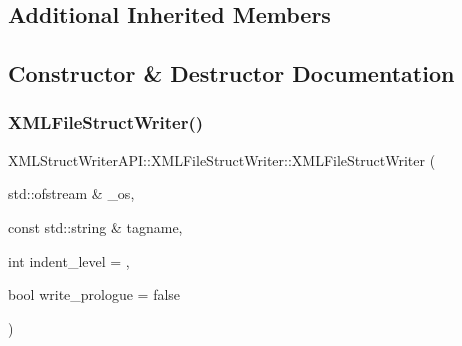 \subsection*{Additional Inherited Members}


\subsection{Constructor \& Destructor Documentation}
\mbox{\label{classXMLStructWriterAPI_1_1XMLFileStructWriter_a7045796a887cf66a8ee5a355a1f3c4a9}} 
\subsubsection{\texorpdfstring{XMLFileStructWriter()}{XMLFileStructWriter()}\hspace{0.1cm}{\footnotesize\ttfamily [1/2]}}
{\footnotesize\ttfamily X\+M\+L\+Struct\+Writer\+A\+P\+I\+::\+X\+M\+L\+File\+Struct\+Writer\+::\+X\+M\+L\+File\+Struct\+Writer (\begin{DoxyParamCaption}\item[{std\+::ofstream \&}]{\+\_\+os,  }\item[{const std\+::string \&}]{tagname,  }\item[{int}]{indent\+\_\+level = {},  }\item[{bool}]{write\+\_\+prologue = {\ttfamily false} }\end{DoxyParamCaption})\hspace{0.3cm}{\ttfamily [inline]}}

